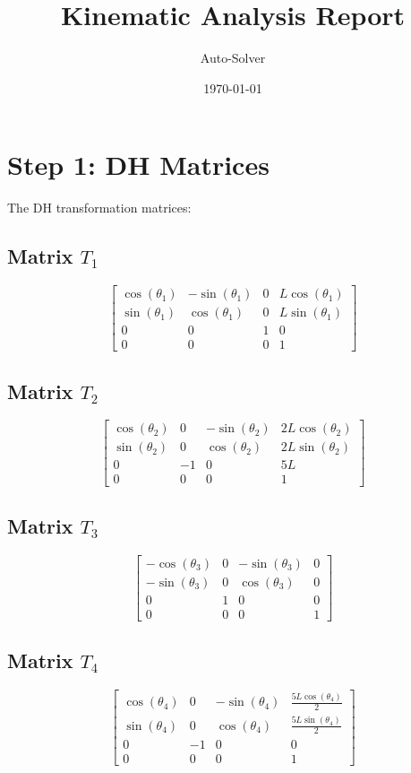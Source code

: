 \documentclass[12pt, a4paper]{article}
\title{\textbf{Kinematic Analysis Report}}
\author{Auto-Solver}
\date{\today}
\begin{document}
\maketitle

\section{Step 1: DH Matrices}
The DH transformation matrices:
\subsection*{Matrix $T_{1}$}
\[ \left[\begin{matrix}\cos{\left(\theta_{1} \right)} & - \sin{\left(\theta_{1} \right)} & 0 & L \cos{\left(\theta_{1} \right)}\\\sin{\left(\theta_{1} \right)} & \cos{\left(\theta_{1} \right)} & 0 & L \sin{\left(\theta_{1} \right)}\\0 & 0 & 1 & 0\\0 & 0 & 0 & 1\end{matrix}\right] \]
\subsection*{Matrix $T_{2}$}
\[ \left[\begin{matrix}\cos{\left(\theta_{2} \right)} & 0 & - \sin{\left(\theta_{2} \right)} & 2 L \cos{\left(\theta_{2} \right)}\\\sin{\left(\theta_{2} \right)} & 0 & \cos{\left(\theta_{2} \right)} & 2 L \sin{\left(\theta_{2} \right)}\\0 & -1 & 0 & 5 L\\0 & 0 & 0 & 1\end{matrix}\right] \]
\subsection*{Matrix $T_{3}$}
\[ \left[\begin{matrix}- \cos{\left(\theta_{3} \right)} & 0 & - \sin{\left(\theta_{3} \right)} & 0\\- \sin{\left(\theta_{3} \right)} & 0 & \cos{\left(\theta_{3} \right)} & 0\\0 & 1 & 0 & 0\\0 & 0 & 0 & 1\end{matrix}\right] \]
\subsection*{Matrix $T_{4}$}
\[ \left[\begin{matrix}\cos{\left(\theta_{4} \right)} & 0 & - \sin{\left(\theta_{4} \right)} & \frac{5 L \cos{\left(\theta_{4} \right)}}{2}\\\sin{\left(\theta_{4} \right)} & 0 & \cos{\left(\theta_{4} \right)} & \frac{5 L \sin{\left(\theta_{4} \right)}}{2}\\0 & -1 & 0 & 0\\0 & 0 & 0 & 1\end{matrix}\right] \]
\end{document}
